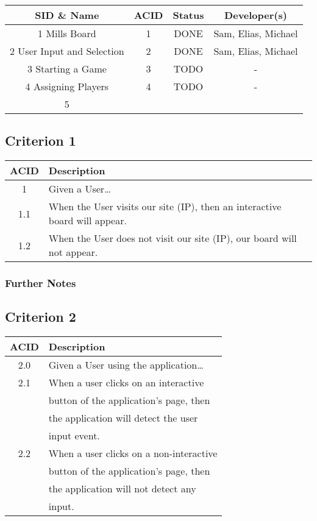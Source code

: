 \documentclass[11pt]{article}
\begin{document}
\begin{center}
\begin{tabular}{|c|c|c|c|}
SID \& Name & ACID & Status & Developer(s)\\
\hline
1 Mills Board & 1 & DONE & Sam, Elias, Michael\\
\hline
2 User Input and Selection & 2 & DONE & Sam, Elias, Michael\\
\hline
3 Starting a Game & 3 & TODO & -\\
\hline
4 Assigning Players & 4 & TODO & -\\
\hline
5 &  &  & \\
\end{tabular}
\end{center}
\subsection{Criterion 1}
\label{sec:org1602e50}
\begin{center}
\begin{tabular}{|c|l|}
ACID & Description\\
\hline
1 & Given a User\ldots{}\\
\hline
1.1 & When the User visits our site (IP), then an interactive board will appear.\\
1.2 & When the User does not visit our site (IP), our board will not appear.\\
\end{tabular}
\end{center}

\subsubsection*{Further Notes}
\label{sec:org75f593d}
\subsection*{Criterion 2}
\label{sec:org262da57}
\begin{center}
\begin{tabular}{|c|l|}
ACID & Description\\
\hline
2.0 & Given a User using the application\ldots{}\\
\hline
2.1 & When a user clicks on an interactive\\
 & button of the application's page, then\\
 & the application will detect the user\\
 & input event.\\
2.2 & When a user clicks on a non-interactive\\
 & button of the application's page, then\\
 & the application will not detect any\\
 & input.\\
\end{tabular}
\end{center}
\end{document}
